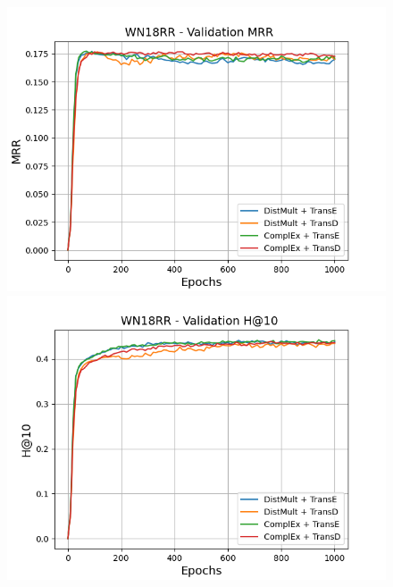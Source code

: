 \begin{figure}[H]
    \centering
    \begin{minipage}{.45\textwidth}
      \centering
      \includegraphics[width=0.9\linewidth]{figures/results/gan_train/not_pretrained/uncertainty/max/entropy/wn18rr/1k_epochs/uncertainty_wn18rr_mrrs.png}
    \end{minipage}%
    \begin{minipage}{.45\textwidth}
      \centering
      \includegraphics[width=0.9\linewidth]{figures/results/gan_train/not_pretrained/uncertainty/max/entropy/wn18rr/1k_epochs/uncertainty_wn18rr_hit10.png}
    \end{minipage}
    

\end{figure}
